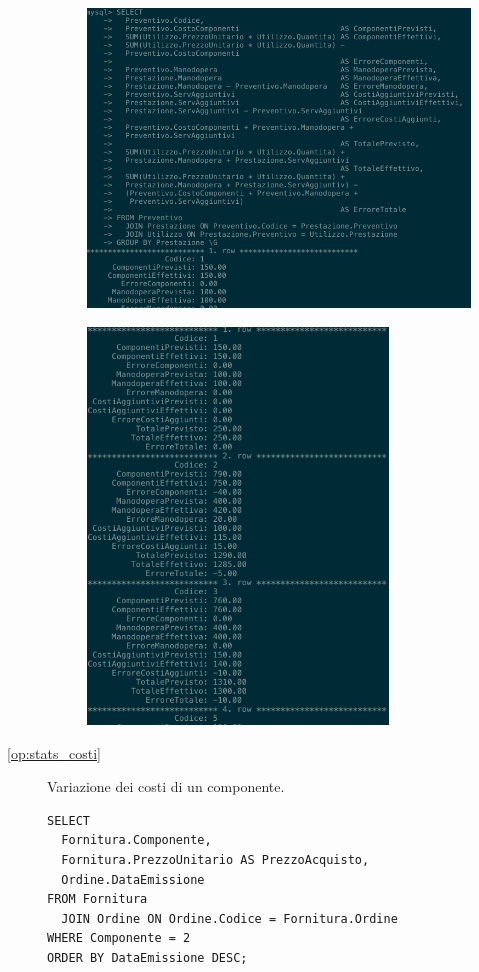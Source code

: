 \begin{description}
              \begin{figure}[H]
                \centering
                \includegraphics[width=12cm]{images/screenshots/scostamento_1.png}
              \end{figure}

              \begin{figure}[H]
                \centering
                \includegraphics[width=8cm]{images/screenshots/scostamento_2.png}
              \end{figure}

            \item[\ref{op:stats_costi}] Variazione dei costi di un componente.

              \begin{lstlisting}
SELECT
  Fornitura.Componente,
  Fornitura.PrezzoUnitario AS PrezzoAcquisto,
  Ordine.DataEmissione
FROM Fornitura
  JOIN Ordine ON Ordine.Codice = Fornitura.Ordine
WHERE Componente = 2
ORDER BY DataEmissione DESC;
              \end{lstlisting}


\end{description}
